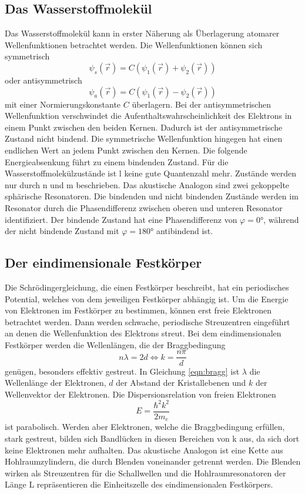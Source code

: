 \subsection{Das Wasserstoffmolekül}
Das Wasserstoffmolekül kann in erster Näherung als Überlagerung atomarer Wellenfunktionen betrachtet werden.
Die Wellenfunktionen können sich symmetrisch
\begin{equation}
    \psi_s(\vec{r}) = C(\psi_1(\vec{r})+\psi_2(\vec{r}))
\end{equation}
oder antisymmetrisch
\begin{equation}
    \psi_a(\vec{r}) = C(\psi_1(\vec{r})-\psi_2(\vec{r}))
\end{equation}
mit einer Normierungskonstante $C$ überlagern. Bei der antisymmetrischen Wellenfunktion verschwindet die Aufenthaltswahrscheinlichkeit des Elektrons
in einem Punkt zwischen den beiden Kernen. Dadurch ist der antisymmetrische Zustand nicht bindend. 
Die symmetrische Wellenfunktion hingegen hat einen endlichen Wert an jedem Punkt zwischen den Kernen. Die folgende Energieabsenkung führt zu einem bindenden Zustand.
Für die Wasserstoffmolekülzustände ist l keine gute Quantenzahl mehr. Zustände werden nur durch n und m beschrieben.
Das akustische Analogon sind zwei gekoppelte sphärische Resonatoren. Die bindenden und nicht bindenden Zustände werden im Resonator durch die Phasendifferenz zwischen
oberen und unteren Resonator identifiziert. Der bindende Zustand hat eine Phasendifferenz von $\varphi = \ang{0;;}$, während der nicht bindende Zustand mit $\varphi = \ang{180;;}$ antibindend ist.

\subsection{Der eindimensionale Festkörper}
Die Schrödingergleichung, die einen Festkörper beschreibt, hat ein periodisches Potential, welches von dem jeweiligen Festkörper abhängig ist.
Um die Energie von Elektronen im Festkörper zu bestimmen, können erst freie Elektronen betrachtet werden. Dann werden schwache, periodische Streuzentren
eingeführt an denen die Wellenfunktion des Elektrons streut. 
Bei dem eindimensionalen Festkörper werden die Wellenlängen, die der Braggbedingung 
\begin{equation}
    n \lambda = 2 d \iff k = \frac{n \pi}{d}
    \label{eqn:bragg}
\end{equation}
genügen, besonders effektiv gestreut. In Gleichung \eqref{eqn:bragg} ist $\lambda$ die Wellenlänge der Elektronen, $d$ der Abstand der Kristallebenen und $k$ der Wellenvektor der Elektronen.
Die Dispersionsrelation von freien Elektronen
\begin{equation}
    E = \frac{\hbar^2 k^2}{2 m_e}
\end{equation}
ist parabolisch. Werden aber Elektronen, welche die Braggbedingung erfüllen, stark gestreut, bilden sich Bandlücken in diesen Bereichen von k aus, da sich
dort keine Elektronen mehr aufhalten. 
Das akustische Analogon ist eine Kette aus Hohlraumzylindern, die durch Blenden voneinander getrennt werden. Die Blenden wirken als Streuzentren für 
die Schallwellen und die Hohlraumresonatoren der Länge L repräsentieren die Einheitszelle des eindimensionalen Festkörpers.


